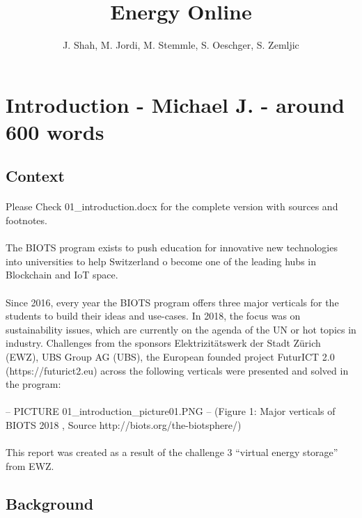 \documentclass{scrartcl}
\begin{document}
	
	\title{Energy Online}
	\subtitle{}
	\author{J. Shah, M. Jordi, M. Stemmle, S. Oeschger, S. Zemljic}
	
	\maketitle
	\section{Introduction - Michael J. - around 600 words}
	\subsection{Context}
    \paragraph{}
    Please Check 01\_introduction.docx for the complete version with sources and footnotes.
    \paragraph{}
    The BIOTS program exists to push education for innovative new technologies into universities to help Switzerland o become one of the leading hubs in Blockchain and IoT space. 
    \paragraph{}
    Since 2016, every year the BIOTS program offers three major verticals for the students to build their ideas and use-cases. In 2018, the focus was on sustainability issues, which are currently on the agenda of the UN or hot topics in industry. Challenges from the sponsors Elektrizitätswerk der Stadt Zürich (EWZ), UBS Group AG (UBS), the European founded project FuturICT 2.0 (https://futurict2.eu) across the following verticals were presented and solved in the program:
    \paragraph{}
    -- PICTURE 01\_introduction\_picture01.PNG -- 
    (Figure 1: Major verticals of BIOTS 2018 , Source http://biots.org/the-biotsphere/)
    \paragraph{}
        This report was created as a result of the challenge 3 “virtual energy storage” from EWZ. 
    \subsection{Background}
\end{document}
